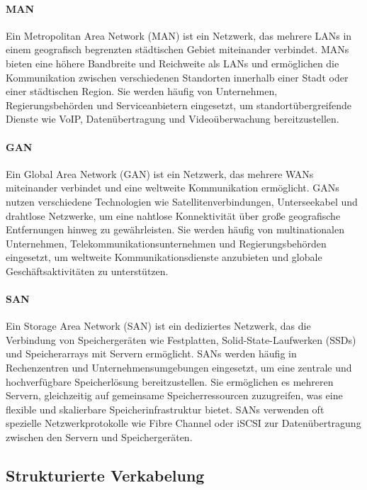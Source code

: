 \paragraph{MAN}

Ein Metropolitan Area Network (MAN) ist ein Netzwerk, das mehrere LANs in einem geografisch begrenzten städtischen Gebiet miteinander verbindet. MANs bieten eine höhere Bandbreite und Reichweite als LANs und ermöglichen die Kommunikation zwischen verschiedenen Standorten innerhalb einer Stadt oder einer städtischen Region. Sie werden häufig von Unternehmen, Regierungsbehörden und Serviceanbietern eingesetzt, um standortübergreifende Dienste wie VoIP, Datenübertragung und Videoüberwachung bereitzustellen.

\paragraph{GAN}

Ein Global Area Network (GAN) ist ein Netzwerk, das mehrere WANs miteinander verbindet und eine weltweite Kommunikation ermöglicht. GANs nutzen verschiedene Technologien wie Satellitenverbindungen, Unterseekabel und drahtlose Netzwerke, um eine nahtlose Konnektivität über große geografische Entfernungen hinweg zu gewährleisten. Sie werden häufig von multinationalen Unternehmen, Telekommunikationsunternehmen und Regierungsbehörden eingesetzt, um weltweite Kommunikationsdienste anzubieten und globale Geschäftsaktivitäten zu unterstützen.

\paragraph{SAN}

Ein Storage Area Network (SAN) ist ein dediziertes Netzwerk, das die Verbindung von Speichergeräten wie Festplatten, Solid-State-Laufwerken (SSDs) und Speicherarrays mit Servern ermöglicht. SANs werden häufig in Rechenzentren und Unternehmensumgebungen eingesetzt, um eine zentrale und hochverfügbare Speicherlösung bereitzustellen. Sie ermöglichen es mehreren Servern, gleichzeitig auf gemeinsame Speicherressourcen zuzugreifen, was eine flexible und skalierbare Speicherinfrastruktur bietet. SANs verwenden oft spezielle Netzwerkprotokolle wie Fibre Channel oder iSCSI zur Datenübertragung zwischen den Servern und Speichergeräten.

\subsection{Strukturierte Verkabelung}

